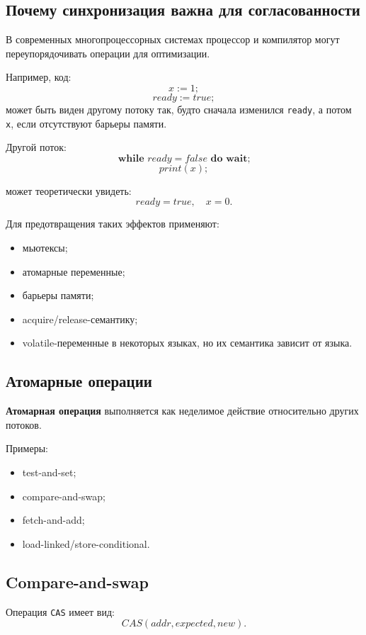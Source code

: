 \documentclass[12pt,a4paper]{article}
\begin{document}
\subsection{Почему синхронизация важна для согласованности}

В современных многопроцессорных системах процессор и компилятор могут переупорядочивать операции для оптимизации.

Например, код:
\[
x := 1;
\]
\[
ready := true;
\]
может быть виден другому потоку так, будто сначала изменился \texttt{ready}, а потом \texttt{x}, если отсутствуют барьеры памяти.

Другой поток:
\[
\textbf{while } ready = false \textbf{ do wait;}
\]
\[
print(x);
\]

может теоретически увидеть:
\[
ready = true,
\quad
x = 0.
\]

Для предотвращения таких эффектов применяют:
\begin{itemize}
    \item мьютексы;
    \item атомарные переменные;
    \item барьеры памяти;
    \item acquire/release-семантику;
    \item volatile-переменные в некоторых языках, но их семантика зависит от языка.
\end{itemize}

\subsection{Атомарные операции}

\textbf{Атомарная операция} выполняется как неделимое действие относительно других потоков.

Примеры:
\begin{itemize}
    \item test-and-set;
    \item compare-and-swap;
    \item fetch-and-add;
    \item load-linked/store-conditional.
\end{itemize}

\subsection{Compare-and-swap}

Операция \texttt{CAS} имеет вид:
\[
CAS(addr, expected, new).
\]
\end{document}
